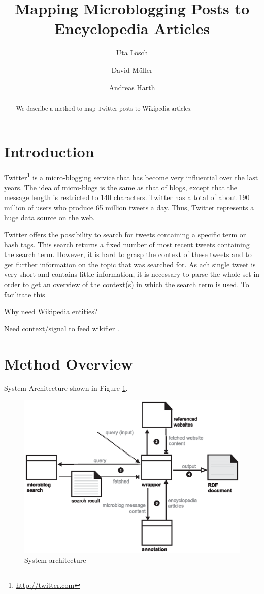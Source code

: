 \documentclass{llncs}
\title{Mapping Microblogging Posts to Encyclopedia Articles}
\author{Uta L\"{o}sch \and David M\"{u}ller \and Andreas Harth}
\institute{
	Karlsruhe Institute of Technology (KIT), D-76131 Karlsruhe, Germany\\ 
	\email{uta.loesch@kit.edu},\\
	\email{david.mueller@student.kit.edu},\\
	\email{harth@kit.edu}
}
\begin{document}
\maketitle

\begin{abstract}
We describe a method to map Twitter posts to Wikipedia articles.
\end{abstract}

\section{Introduction}

Twitter\footnote{\url{http://twitter.com}} is a micro-blogging service that has become very influential over the last years. The idea of micro-blogs is the same as that of blogs, except that the message length is restricted to 140 characters. Twitter has a total of about 190 million of users who produce 65 million tweets a day. Thus, Twitter represents a huge data source on the web.

Twitter offers the possibility to search for tweets containing a specific term or hash tags. This search returns a fixed number of most recent tweets containing the search term. However, it is hard to grasp the context of these tweets and to get further information on the topic that was searched for. As ach single tweet is very short and contains little information, it is necessary to parse the whole set in order to get an overview of the context(s) in which the search term is used. To facilitate this 

Why need Wikipedia entities?

Need context/signal to feed wikifier \cite{key:wikifier}.

\section{Method Overview}

System Architecture shown in Figure \ref{fig:arch}.

\begin{figure}[htb]
  \centering
  \includegraphics[width=.6\linewidth]{architecture}
  \caption{System architecture}
  \label{fig:arch}
\end{figure}
\end{document}
